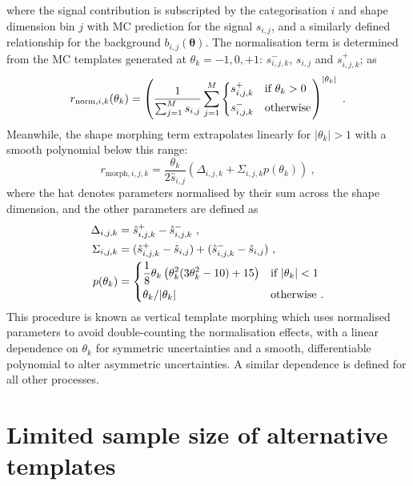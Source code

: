 where the signal contribution is subscripted by the categorisation $i$ and shape dimension bin $j$ with MC prediction for the signal $s_{i,j}$, and a similarly defined relationship for the background $b_{i,j}(\bm{\theta})$. The normalisation term is determined from the MC templates generated at ${\theta_k=-1,0,+1}$: $s_{i,j,k}^{-}$, $s_{i,j}$ and $s_{i,j,k}^{+}$; as
%
\begin{equation}
    r_{\mathrm{norm},i,k}(\theta_k) = \left(\frac{1}{\sum_{j=1}^{M}s_{i,j}}\sum_{j=1}^{M}
    \begin{dcases}
        s_{i,j,k}^+ & \text{if }\theta_k> 0\\
        s_{i,j,k}^- & \text{otherwise}
    \end{dcases}\right)^{|\theta_k|}\ .
\end{equation}
%
Meanwhile, the shape morphing term extrapolates linearly for $|\theta_k|>1$ with a smooth polynomial below this range:
%
\begin{equation}
    r_{\mathrm{morph},i,j,k} = \frac{\theta_k}{2\hat{s}_{i,j}}\left(\Delta_{i,j,k} + \Sigma_{i,j,k}p(\theta_k)\right)\ ,
\end{equation}
%
where the hat denotes parameters normalised by their sum across the shape dimension, and the other parameters are defined as
%
\begin{align}
    \Delta_{i,j,k} & = \hat{s}_{i,j,k}^+ - \hat{s}_{i,j,k}^-\ ,\\
    \Sigma_{i,j,k} & = (\hat{s}_{i,j,k}^+-\hat{s}_{i,j}) + (\hat{s}_{i,j,k}^{-}-\hat{s}_{i,j})\ ,\\
    p(\theta_k) & =
    \begin{dcases}
        \frac{1}{8}\theta_k\left(\theta_k^2(3\theta_k^2-10)+15\right) & \text{if }|\theta_k|< 1 \\
        \theta_k/|\theta_k| & \text{otherwise}\ .
    \end{dcases}
\end{align}
%
This procedure is known as vertical template morphing\cite{Conway:2011in} which uses normalised parameters to avoid double-counting the normalisation effects, with a linear dependence on $\theta_k$ for symmetric uncertainties and a smooth, differentiable polynomial to alter asymmetric uncertainties. A similar dependence is defined for all other processes.


\section{Limited sample size of alternative templates}

